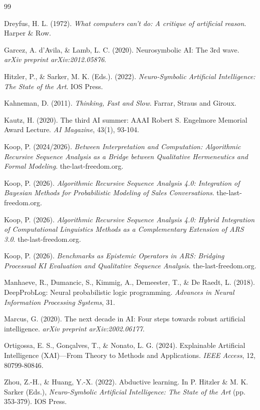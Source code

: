\documentclass[12pt,a4paper]{article}
\begin{document}
\newpage
\begin{thebibliography}{99}

Dreyfus, H. L. (1972). \textit{What computers can't do: A critique of artificial 
reason}. Harper \& Row.

Garcez, A. d'Avila, \& Lamb, L. C. (2020). Neurosymbolic AI: The 3rd wave. 
\textit{arXiv preprint arXiv:2012.05876}.

Hitzler, P., \& Sarker, M. K. (Eds.). (2022). \textit{Neuro-Symbolic Artificial 
Intelligence: The State of the Art}. IOS Press.

Kahneman, D. (2011). \textit{Thinking, Fast and Slow}. Farrar, Straus and Giroux.

Kautz, H. (2020). The third AI summer: AAAI Robert S. Engelmore Memorial Award 
Lecture. \textit{AI Magazine}, 43(1), 93-104.

Koop, P. (2024/2026). \textit{Between Interpretation and Computation: Algorithmic 
Recursive Sequence Analysis as a Bridge between Qualitative Hermeneutics and 
Formal Modeling}. the-last-freedom.org.

Koop, P. (2026). \textit{Algorithmic Recursive Sequence Analysis 4.0: Integration 
of Bayesian Methods for Probabilistic Modeling of Sales Conversations}. 
the-last-freedom.org.

Koop, P. (2026). \textit{Algorithmic Recursive Sequence Analysis 4.0: Hybrid 
Integration of Computational Linguistics Methods as a Complementary Extension 
of ARS 3.0}. the-last-freedom.org.

Koop, P. (2026). \textit{Benchmarks as Epistemic Operators in ARS: Bridging 
Processual KI Evaluation and Qualitative Sequence Analysis}. the-last-freedom.org.

Manhaeve, R., Dumancic, S., Kimmig, A., Demeester, T., \& De Raedt, L. (2018). 
DeepProbLog: Neural probabilistic logic programming. \textit{Advances in Neural 
Information Processing Systems}, 31.

Marcus, G. (2020). The next decade in AI: Four steps towards robust artificial 
intelligence. \textit{arXiv preprint arXiv:2002.06177}.

Ortigossa, E. S., Gonçalves, T., \& Nonato, L. G. (2024). Explainable Artificial 
Intelligence (XAI)—From Theory to Methods and Applications. \textit{IEEE Access}, 
12, 80799-80846.

Zhou, Z.-H., \& Huang, Y.-X. (2022). Abductive learning. In P. Hitzler \& 
M. K. Sarker (Eds.), \textit{Neuro-Symbolic Artificial Intelligence: The State 
of the Art} (pp. 353-379). IOS Press.

\end{thebibliography}
\end{document}
